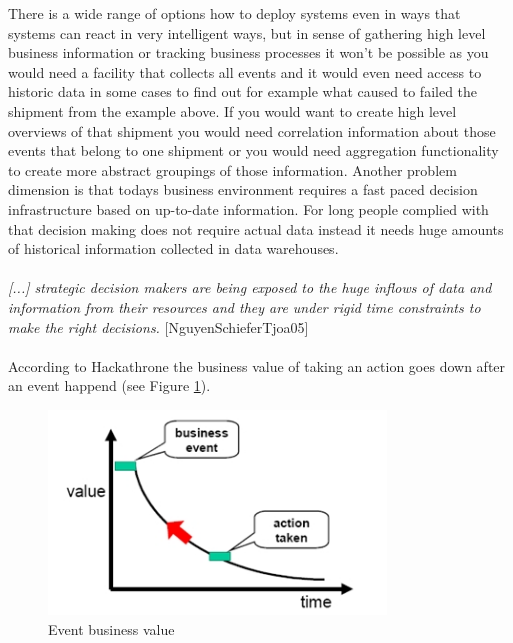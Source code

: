 \documentclass[a4paper,titlepage,11pt,DIV10,BCOR0.5cm,headinclude]{article}
\begin{document}
There is a wide range of options how to deploy systems even in ways that systems can react in very intelligent ways, but in sense of gathering high level business information or tracking business processes it won't be possible as you would need a facility that collects all events and it would even need access to historic data in some cases to find out for example what caused to failed the shipment from the example above. If you would want to create high level overviews of that shipment you would need correlation information about those events that belong to one shipment or you would need aggregation functionality to create more abstract groupings of those information. Another problem dimension is that todays business environment requires a fast paced  decision infrastructure based on up-to-date information. For long people complied with that decision making does not require actual data instead it needs huge amounts of historical information collected in data warehouses. 
\\\\
\textit{[...] strategic decision makers are being exposed to the huge inflows of data and information from their resources and they are under rigid time constraints to make the right decisions.} [NguyenSchieferTjoa05]
\\\\
According to Hackathrone the business value of taking an action goes down after an event happend (see Figure \ref{fig:event-basedNotifications [Hackathorn02]}).

\begin{figure} [ht]                
	\centering                                           
	\includegraphics[width=0.8\textwidth]{pics/businessValue.jpg}
	\caption{Event business value}             
	\label{fig:event-basedNotifications [Hackathorn02]}
\end{figure}  
\end{document}
